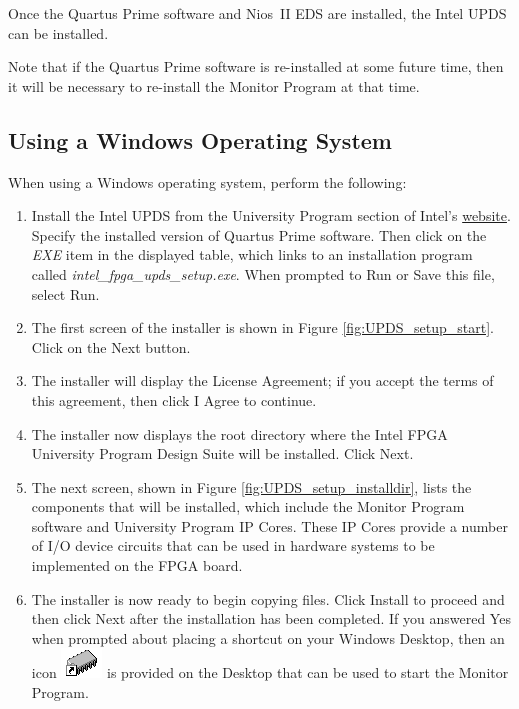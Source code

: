 \documentclass[11pt, twoside, pdftex]{article}
\begin{document}
Once the Quartus Prime software and Nios~II EDS are installed,
the Intel UPDS can be installed.

Note that if the Quartus Prime software is re-installed at some
future time, then it will be necessary to re-install the Monitor
Program at that time.

\subsection{Using a Windows Operating System}

When using a Windows operating system, perform the following: 

\begin{enumerate}
\item Install the Intel UPDS from the University Program section of Intel's \href{https://www.intel.com/content/www/us/en/programmable/support/training/university/materials-software.html}{website}.
Specify the installed version of Quartus Prime software.
Then click on the {\it EXE} item in the displayed table, 
which links to an installation program called 
{\it intel\_fpga\_upds\_setup.exe}. When prompted to 
{\sf Run} or {\sf Save} this file, select {\sf Run}. 
		  
\item The first screen of the installer is shown in Figure \ref{fig:UPDS_setup_start}.
Click on the {\sf Next} button.

 \item The installer will display the License Agreement; if you accept the terms of this agreement, then click {\sf I Agree} to
continue.
	
\item The installer now displays the root directory where the
Intel FPGA University Program Design Suite will be installed.  
Click {\sf Next}.

\item The next screen, shown in Figure \ref{fig:UPDS_setup_installdir}, lists the components that will be installed, which include the Monitor Program
software and University Program IP Cores. These IP Cores provide
a number of I/O device circuits that can be used in hardware
systems to be implemented on the FPGA board.

\item The installer is now ready to begin copying files. 
Click {\sf Install} to proceed and then click {\sf Next} after
the installation has been completed. 
If you answered {\sf Yes} when prompted about placing a shortcut on your Windows Desktop, then an icon 
\hbox{\includegraphics[scale=0.65]{images/img_shortcut_sm.png}}
is provided on the Desktop that can be used to start the Monitor
Program.


\end{enumerate}
\end{document}
